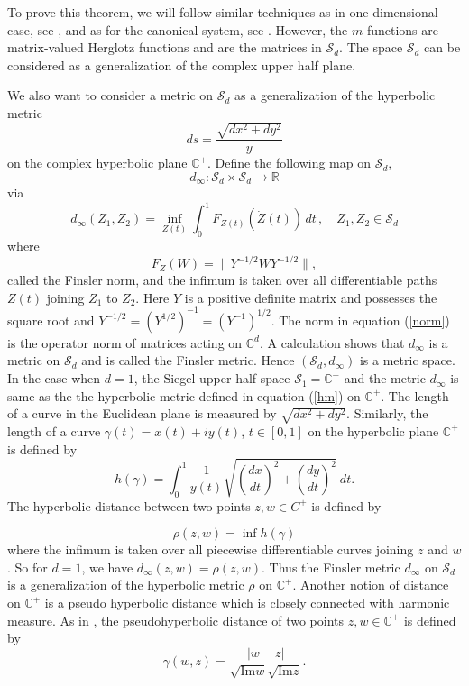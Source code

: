 \documentclass[reqno]{amsart}
\numberwithin{equation}{section}
\newcommand{\C}{\mathbb{C}}
\newcommand{\R}{\mathbb{R}}
\begin{document}
 
To prove this theorem, we will follow similar techniques as in one-dimensional case, see \cite{CR1}, and as for the canonical system, see \cite{KA1}. However, the $m$ functions are matrix-valued Herglotz functions and are the matrices in $\mathcal S_d .$ The space $\mathcal S_d$ can be considered as a generalization of the complex upper half plane.   

We also want to consider a metric on  $\mathcal S_d$ as a generalization of the hyperbolic metric 
\begin{equation}\label{hm}
	ds = \frac{\sqrt{dx^2 +dy^2}}{y}
\end{equation}
on the complex hyperbolic plane $\C^+.$ Define the following   map on $\mathcal{S}_d$, $$d_\infty:\mathcal{S}_d\times\mathcal{S}_d\to\R$$ via	
\begin{equation}\label{ms}
	d_{\infty}(Z_1, Z_2) = \inf_{Z(t)} \int _0^1 F_{Z(t)}(\dot{Z}(t))\,dt\,, \quad Z_1,  Z_2\in\mathcal{S}_d
\end{equation}
where
\begin{equation}\label{norm} 
	F_Z(W) = \|Y^{-1/2}WY^{-1/2}\|,
\end{equation} 
called the Finsler norm, and the infimum is taken over all differentiable paths $Z(t)$ joining $Z_1$ to $Z_2$. Here $Y$ is a positive definite matrix and possesses the square root and $Y^{-1/2} = (Y^{1/2})^{-1} = (Y^{-1})^{1/2}$.  The norm in equation (\ref{norm}) is the operator norm of matrices acting on $\C^d$. A calculation shows that $d_\infty$ is a metric on $\mathcal{S}_d$ and is called the Finsler metric. Hence $(\mathcal{S}_d, d_\infty)$ is a metric space. In the case when $d=1$, the Siegel upper half space $\mathcal S_1 = \C^+$ and the metric $d_{\infty}$ is same as the the hyperbolic metric defined in equation (\ref{hm}) on $\C^+$.  The length of a curve in the Euclidean plane is measured by $\sqrt{dx^2 +dy^2}$.   Similarly, the length of a curve $\gamma(t) = x(t) +i y(t)$, $t\in [0,1]$ on the hyperbolic plane $\C^+$ is defined by
\begin{equation*}
	h(\gamma) = \int _0^1 \frac{1}{y(t)}\sqrt{\left(\frac{dx}{dt}\right)^2 + \left(\frac{dy}{dt}\right)^2}\ dt.
\end{equation*}
The hyperbolic distance between two points $z, w \in C^+$ is defined by 

\begin{equation*}
	\rho(z,w) = \inf h(\gamma)
\end{equation*}
where the infimum is taken over all piecewise differentiable curves joining $z$ and $w$.  So for  $d=1$,  we have $d_{\infty}(z, w)= \rho (z, w)$.  Thus the Finsler metric $d_{\infty}$ on $\mathcal S_d$ is a generalization of the hyperbolic metric $\rho$ on $\C^+$. Another notion of distance on $\C^+$ is a pseudo hyperbolic distance which is closely connected with harmonic measure. As in \cite{CR1}, the pseudohyperbolic distance of two points $z, w \in \C^+$ is defined by  \[ \gamma(w,z)
= \frac{|w-z|}{\sqrt{ \text{Im}w}\sqrt{\text{Im}z}}.\] 
\end{document}
